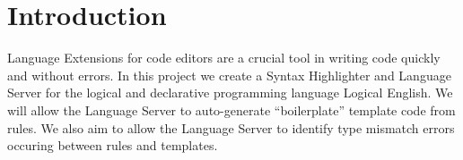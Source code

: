 \documentclass[../main.tex]{subfiles}
\begin{document}
\section*{Introduction}
Language Extensions for code editors are a crucial tool in writing code quickly and without errors. In this project we create a Syntax Highlighter and Language Server for the logical and declarative programming language Logical English. We will allow the Language Server to auto-generate ``boilerplate'' template code from rules. We also aim to allow the Language Server to identify type mismatch errors occuring between rules and templates.
\end{document}
